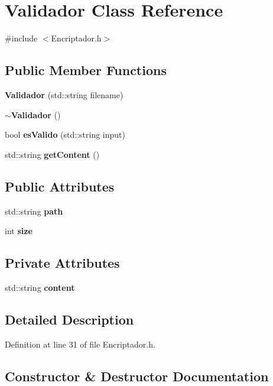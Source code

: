 \section{Validador Class Reference}
\label{class_validador}


{\ttfamily \#include $<$Encriptador.\-h$>$}

\subsection*{Public Member Functions}
\begin{DoxyCompactItemize}
\item 
{\bf Validador} (std\-::string filename)
\item 
{\bf $\sim$\-Validador} ()
\item 
bool {\bf es\-Valido} (std\-::string input)
\item 
std\-::string {\bf get\-Content} ()
\end{DoxyCompactItemize}
\subsection*{Public Attributes}
\begin{DoxyCompactItemize}
\item 
std\-::string {\bf path}
\item 
int {\bf size}
\end{DoxyCompactItemize}
\subsection*{Private Attributes}
\begin{DoxyCompactItemize}
\item 
std\-::string {\bf content}
\end{DoxyCompactItemize}


\subsection{Detailed Description}


Definition at line 31 of file Encriptador.\-h.



\subsection{Constructor \& Destructor Documentation}
